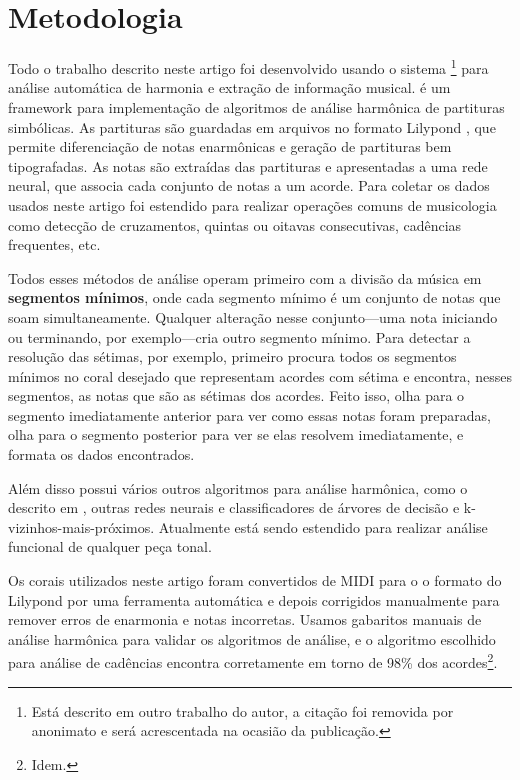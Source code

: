 \section{Metodologia}
\label{sec:metodologia}

Todo o trabalho descrito neste artigo foi desenvolvido usando o
sistema \rameau{}\footnote{Está descrito em outro trabalho do autor, a
  citação foi removida por anonimato e será acrescentada na ocasião da
  publicação.} para análise automática de harmonia e extração de
informação musical. \rameau{} é um framework para implementação de
algoritmos de análise harmônica de partituras simbólicas. As
partituras são guardadas em arquivos no formato Lilypond
\cite{nienhuys.ea08:lilypond}, que permite diferenciação de notas
enarmônicas e geração de partituras bem tipografadas. As notas são
extraídas das partituras e apresentadas a uma rede neural, que associa
cada conjunto de notas a um acorde. Para coletar os dados usados neste
artigo \rameau{} foi estendido para realizar operações comuns de
musicologia como detecção de cruzamentos, quintas ou oitavas
consecutivas, cadências frequentes, etc.

Todos esses métodos de análise operam primeiro com a divisão da música
em \textbf{segmentos mínimos}, onde cada segmento mínimo é um conjunto
de notas que soam simultaneamente. Qualquer alteração nesse
conjunto---uma nota iniciando ou terminando, por exemplo---cria outro
segmento mínimo. Para detectar a resolução das sétimas, por exemplo,
\rameau{} primeiro procura todos os segmentos mínimos no coral
desejado que representam acordes com sétima e encontra, nesses
segmentos, as notas que são as sétimas dos acordes. Feito isso,
\rameau{} olha para o segmento imediatamente anterior para ver como
essas notas foram preparadas, olha para o segmento posterior para ver
se elas resolvem imediatamente, e formata os dados encontrados.

Além disso \rameau{} possui vários outros algoritmos para análise
harmônica, como o descrito em \cite{pardo.ea00:automated}, outras
redes neurais e classificadores de árvores de decisão e
k-vizinhos-mais-próximos. Atualmente \rameau{} está sendo estendido
para realizar análise funcional de qualquer peça tonal.

Os corais utilizados neste artigo foram convertidos de MIDI para o o
formato do Lilypond por uma ferramenta automática e depois corrigidos
manualmente para remover erros de enarmonia e notas incorretas. Usamos
gabaritos manuais de análise harmônica para validar os algoritmos de
análise, e o algoritmo escolhido para análise de cadências encontra
corretamente em torno de 98\% dos acordes\footnote{Idem.}.

